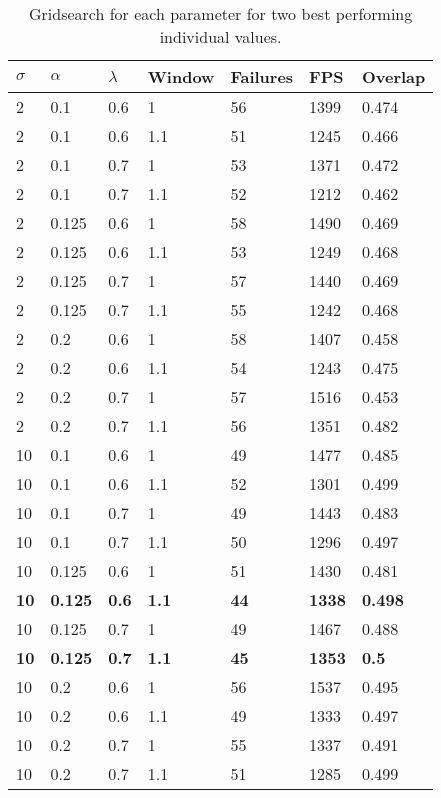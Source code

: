 \documentclass[9pt]{IEEEtran}
\begin{document}
\begin{table}[!ht]
    \centering
    \begin{tabular}{llll|lll}
        \textbf{$\sigma$} & \textbf{$\alpha$} & \textbf{$\lambda$} & \textbf{Window} & \textbf{Failures} & \textbf{FPS} & \textbf{Overlap} \\ \hline
        2 & 0.1 & 0.6 & 1 & 56 & 1399 & 0.474 \\ 
        2 & 0.1 & 0.6 & 1.1 & 51 & 1245 & 0.466 \\ 
        2 & 0.1 & 0.7 & 1 & 53 & 1371 & 0.472 \\ 
        2 & 0.1 & 0.7 & 1.1 & 52 & 1212 & 0.462 \\ 
        2 & 0.125 & 0.6 & 1 & 58 & 1490 & 0.469 \\ 
        2 & 0.125 & 0.6 & 1.1 & 53 & 1249 & 0.468 \\ 
        2 & 0.125 & 0.7 & 1 & 57 & 1440 & 0.469 \\ 
        2 & 0.125 & 0.7 & 1.1 & 55 & 1242 & 0.468 \\ 
        2 & 0.2 & 0.6 & 1 & 58 & 1407 & 0.458 \\ 
        2 & 0.2 & 0.6 & 1.1 & 54 & 1243 & 0.475 \\ 
        2 & 0.2 & 0.7 & 1 & 57 & 1516 & 0.453 \\ 
        2 & 0.2 & 0.7 & 1.1 & 56 & 1351 & 0.482 \\ 
        10 & 0.1 & 0.6 & 1 & 49 & 1477 & 0.485 \\ 
        10 & 0.1 & 0.6 & 1.1 & 52 & 1301 & 0.499 \\ 
        10 & 0.1 & 0.7 & 1 & 49 & 1443 & 0.483 \\ 
        10 & 0.1 & 0.7 & 1.1 & 50 & 1296 & 0.497 \\ 
        10 & 0.125 & 0.6 & 1 & 51 & 1430 & 0.481 \\ 
        \textbf{10} & \textbf{0.125} & \textbf{0.6} & \textbf{1.1} & \textbf{44} & \textbf{1338} & \textbf{0.498} \\
        10 & 0.125 & 0.7 & 1 & 49 & 1467 & 0.488 \\ 
        \textbf{10} & \textbf{0.125} & \textbf{0.7} & \textbf{1.1} & \textbf{45} & \textbf{1353} & \textbf{0.5} \\
        10 & 0.2 & 0.6 & 1 & 56 & 1537 & 0.495 \\ 
        10 & 0.2 & 0.6 & 1.1 & 49 & 1333 & 0.497 \\ 
        10 & 0.2 & 0.7 & 1 & 55 & 1337 & 0.491 \\ 
        10 & 0.2 & 0.7 & 1.1 & 51 & 1285 & 0.499 \\ \hline
    \end{tabular}
    \caption{Gridsearch for each parameter for two best performing individual values.}
    \label{label:grid}
\end{table}
\end{document}
